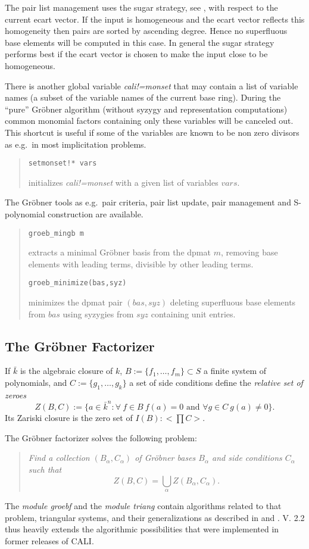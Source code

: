 \documentclass[a4paper,11pt]{article}
\newcommand{\gr}{Gr\"obner}
\newcommand{\ind}[1]{{\em #1}\index{#1}}
\newcommand{\pbx}[1]{\mbox{}\hfill \parbox[t]{12cm}{#1} \pagebreak[3]}
\begin{document}
The pair list management uses the sugar strategy, see \cite{GMNRT},
with respect to the current ecart vector. If the input is homogeneous
and the ecart vector reflects this homogeneity then pairs are sorted
by ascending degree. Hence no superfluous base 
elements will be computed in this case. In general the sugar strategy
performs best if the ecart vector is chosen to make the input close
to be homogeneous.

There is another global variable \ind{cali!=monset} that may contain
a list of variable names (a subset of the variable names of the
current base ring). During the ``pure'' {\gr} algorithm (without syzygy
and representation computations) common monomial factors containing
only these variables will be canceled out. This shortcut is useful if
some of the variables are known to be non zero divisors as e.g.\ in
most implicitation problems.
\begin{quote}
\verb|setmonset!* vars|

\pbx{initializes {\em cali!=monset} with a given list of variables
$vars$.} 
\end{quote}

The {\gr} tools as e.g.\ pair criteria, pair list update, pair
management and S-polynomial construction are available. 
\begin{quote}
\verb|groeb_mingb m|

\pbx{extracts a minimal {\gr} basis from the dpmat $m$, removing base
elements with leading terms, divisible by other leading terms.} 

\verb|groeb_minimize(bas,syz)|

\pbx{minimizes the dpmat pair $(bas,syz)$ deleting superfluous base
elements from $bas$ using syzygies from $syz$ containing unit
entries.} 
\end{quote}

\subsection{The {\gr} Factorizer}

If $\bar{k}$ is the algebraic closure of $k$,
$B:=\{f_1,\ldots,f_m\}\subset S$ a finite system of polynomials, and
$C:=\{g_1,\ldots,g_k\}$ a set of side conditions define the {\em
relative set of zeroes}   
\[Z(B,C):=\{a\in \bar{k}^n : \forall\ f\in B\ f(a)=0\mbox{ and }
\forall g\in C\ g(a)\neq 0\}.\]
Its Zariski closure is the zero set of $I(B):<\prod C>$. 

The {\gr} factorizer solves the following problem:
\begin{quote}
\it Find a collection $(B_\alpha,C_\alpha)$ of {\gr} bases $B_\alpha$
and side conditions $C_\alpha$ such that 
\[Z(B,C) = \bigcup_\alpha Z(B_\alpha,C_\alpha).\]
\end{quote}
The \ind{module groebf} and the \ind{module triang} contain algorithms
related to that problem, triangular systems, and their generalizations
as described in \cite{fgb} and \cite{efgb}. V. 2.2 thus heavily
extends the algorithmic possibilities that were implemented in former
releases of CALI. 
\end{document}
